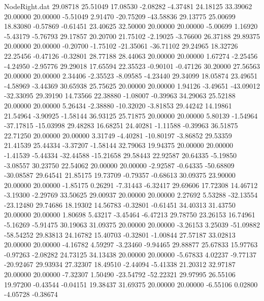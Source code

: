 \begin{filecontents}{NodeRight.dat}
  29.08718   25.51049   17.08530    -2.08282   -4.37481   24.18125   33.39062   20.00000   20.00000   -5.51049    2.91470  -20.75209  -43.58836
  29.13775   25.00699   18.83080    -0.57869   -0.61451   23.40625   32.50000   20.00000   20.00000   -5.00699    1.16920   -5.43179   -5.76793
  29.17857   20.20700   21.75102    -2.19025   -3.76600   26.37188   29.89375   20.00000   20.00000   -0.20700   -1.75102  -21.35061  -36.71102
  29.24965   18.32726   22.25456    -0.47126   -0.32801   28.77188   28.44063   20.00000   20.00000    1.67274   -2.25456   -4.24950   -2.95776
  29.29018   17.65594   22.35523    -0.90101   -0.47126   30.20000   27.56563   20.00000   20.00000    2.34406   -2.35523   -8.09585   -4.23440
  29.34099   18.05874   23.49651    -4.58969   -3.44369   30.65938   25.75625   20.00000   20.00000    1.94126   -3.49651  -43.09012  -32.33095
  29.39190   14.73566   22.38880    -1.08007   -0.39963   34.29063   25.52188   20.00000   20.00000    5.26434   -2.38880  -10.32020   -3.81853
  29.44242   14.19861   21.54964    -3.90925   -1.58144   36.93125   25.71875   20.00000   20.00000    5.80139   -1.54964  -37.17815  -15.03998
  29.48283   16.68251   24.40281    -1.11588   -0.39963   36.51875   22.71250   20.00000   20.00000    3.31749   -4.40281  -10.80197   -3.86852
  29.53359   21.41539   25.44334    -3.37207   -1.58144   32.79063   19.94375   20.00000   20.00000   -1.41539   -5.44334  -32.44588  -15.21658
  29.58443   22.92587   20.64335    -5.19850   -3.08557   30.23750   22.54062   20.00000   20.00000   -2.92587   -0.64335  -50.68809  -30.08587
  29.64541   21.85175   19.73709    -0.79357   -0.68613   30.09375   23.90000   20.00000   20.00000   -1.85175    0.26291   -7.31443   -6.32417
  29.69606   17.72308   14.46712    -3.19300   -2.29769   33.50625   29.00937   20.00000   20.00000    2.27692    5.53288  -32.13554  -23.12480
  29.74686   18.19302   14.56783    -0.32801   -0.61451   34.40313   31.43750   20.00000   20.00000    1.80698    5.43217   -3.45464   -6.47213
  29.78750   23.26153   16.74961    -5.16269   -5.91475   30.19063   31.09375   20.00000   20.00000   -3.26153    3.25039  -51.09882  -58.54252
  29.83813   24.16782   15.40703    -0.32801   -1.00844   27.57187   33.02813   20.00000   20.00000   -4.16782    4.59297   -3.23460   -9.94465
  29.88877   25.67833   15.97763    -0.97263   -2.08282   24.73125   34.13438   20.00000   20.00000   -5.67833    4.02237   -9.77137  -20.92467
  29.93934   27.32307   18.49510    -2.44094   -5.41338   21.20312   32.97187   20.00000   20.00000   -7.32307    1.50490  -23.54792  -52.22321
  29.97995   26.55106   19.97200    -0.43544   -0.04151   19.38437   31.69375   20.00000   20.00000   -6.55106    0.02800   -4.05728   -0.38674

\end{filecontents}
